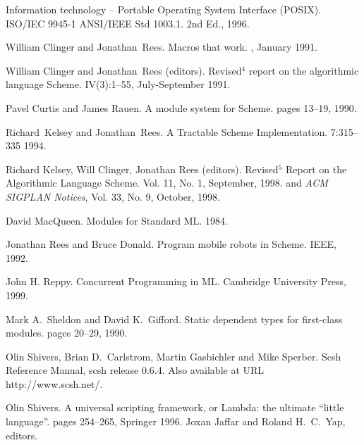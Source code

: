 
\begin{thebibliography}{10}
\addtocounter{chapter}{1}
\T{}

Information technology -- Portable Operating System Interface (POSIX).
\newblock ISO/IEC 9945-1 ANSI/IEEE Std 1003.1.
\newblock 2nd Ed., 1996.

William Clinger and Jonathan~Rees.
\newblock Macros that work.
, January 1991.

William Clinger and Jonathan~Rees (editors).
\newblock Revised${}^4$ report on the algorithmic language {S}cheme.
 IV(3):1--55, July-September 1991.

Pavel Curtis and James Rauen.
\newblock A module system for Scheme.
pages 13--19, 1990.

Richard~Kelsey and Jonathan~Rees.
\newblock A Tractable {Scheme} Implementation.
 7:315--335 1994.

Richard Kelsey, Will Clinger, Jonathan Rees (editors).
\newblock Revised$^5$ Report on the Algorithmic Language Scheme.
 Vol. 11, No. 1,
 September, 1998.
\newblock and {\em ACM SIGPLAN Notices}, Vol. 33, No. 9, October, 1998.

David MacQueen.
\newblock Modules for Standard ML.
1984.

Jonathan Rees and Bruce Donald.
\newblock Program mobile robots in Scheme.
 IEEE, 1992. 

John H. Reppy.
\newblock Concurrent Programming in ML.
\newblock Cambridge University Press, 1999.

Mark A.~Sheldon and David K.~Gifford.
\newblock Static dependent types for first-class modules.
pages 20--29, 1990.

Olin Shivers, Brian D.~Carlstrom, Martin Gasbichler and Mike Sperber.
\newblock Scsh Reference Manual, scsh release 0.6.4.
\newblock Also available at URL http://www.scsh.net/.

Olin Shivers.
\newblock A universal scripting framework, 
 or Lambda: the ultimate ``little language''.
 pages 254--265, Springer 1996.
\newblock Joxan Jaffar and Roland H.~C.~Yap, editors.

\end{thebibliography}
